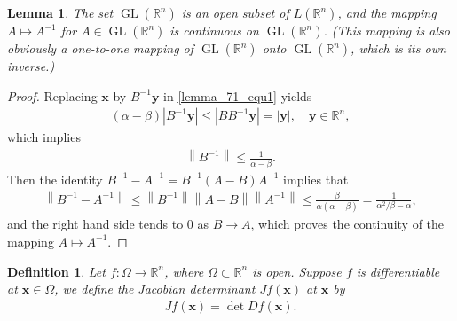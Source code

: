 \documentclass[11pt]{book}
\newtheorem{definition}{Definition}[chapter]
\newtheorem{lemma}{Lemma}[chapter]
\theoremstyle{definition}
\numberwithin{equation}{chapter}
\begin{document}
\begin{lemma}\label{lemma_72}
The set $\operatorname{GL}(\mathbb{R}^n)$ is an open subset of $L(\mathbb{R}^n)$, and the mapping $A \mapsto A^{-1}$ for $A \in \operatorname{GL}(\mathbb{R}^n)$ is continuous on $\operatorname{GL}(\mathbb{R}^n)$. (This mapping is also obviously a one-to-one mapping of $\operatorname{GL}(\mathbb{R}^n)$ onto $\operatorname{GL}(\mathbb{R}^n)$, which is its own inverse.)
\end{lemma}
\begin{proof}
Replacing $\mathbf{x}$ by $B^{-1} \mathbf{y}$ in \eqref{lemma_71_equ1} yields
\begin{align*}
    (\alpha - \beta)\left|B^{-1} \mathbf{y}\right| \leq \left|B B^{-1} \mathbf{y}\right| = \left|\mathbf{y}\right|, \quad \mathbf{y} \in \mathbb{R}^n,
\end{align*}
which implies
\begin{align*}
    \left\|B^{-1}\right\| \leq \frac{1}{\alpha - \beta}.
\end{align*} 
Then the identity $B^{-1} - A^{-1} = B^{-1} (A - B) A^{-1}$ implies that
\begin{align*}
    \left\|B^{-1} - A^{-1}\right\| \leq \left\|B^{-1}\right\| \left\|A - B\right\| \left\|A^{-1}\right\| \leq \frac{\beta}{\alpha(\alpha - \beta)} = \frac{1}{\alpha^2/\beta - \alpha},
\end{align*}
and the right hand side tends to $0$ as $B \to A$, which proves the continuity of the mapping $A \mapsto A^{-1}$.
\end{proof}
    
\medskip

\begin{definition}
Let $f: \Omega \to \mathbb{R}^n$, where $\Omega \subset \mathbb{R}^n$ is open. Suppose $f$ is differentiable at $\mathbf{x} \in  \Omega$, we define the Jacobian determinant $Jf(\mathbf{x})$ at $\mathbf{x}$ by
\begin{align*}
    Jf(\mathbf{x}) = \det Df(\mathbf{x}).
\end{align*}
\end{definition}

\medskip
\end{document}
